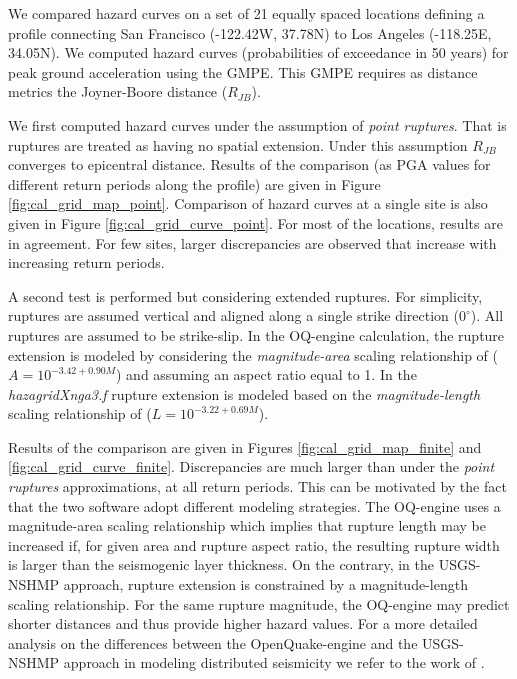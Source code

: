 We compared hazard curves on a set of 21 equally spaced locations defining a profile connecting San Francisco (-122.42W, 37.78N) to Los Angeles (-118.25E, 34.05N). We computed hazard curves (probabilities of exceedance in 50 years) for peak ground acceleration using the \citet{boore2008} GMPE. This GMPE requires as distance metrics the Joyner-Boore distance ($R_{JB}$). 

We first computed hazard curves under the assumption of \textit{point ruptures}. That is ruptures are treated as having no spatial extension. Under this assumption $R_{JB}$ converges to epicentral distance. Results of the comparison (as PGA values for different return periods along the profile) are given in Figure \ref{fig:cal_grid_map_point}. Comparison of hazard curves at a single site is also given in Figure \ref{fig:cal_grid_curve_point}. For most of the locations, results are in agreement. For few sites, larger discrepancies are observed that increase with increasing return periods.

A second test is performed but considering extended ruptures. For simplicity, ruptures are assumed vertical and aligned along a single strike direction ($0^{\circ}$). All ruptures are assumed to be strike-slip. In the OQ-engine calculation, the rupture extension is modeled by considering the \textit{magnitude-area} scaling relationship of \citet{wells1994} ($A = 10^{-3.42 + 0.90 M}$) and assuming an aspect ratio equal to 1. In the \textit{hazagridXnga3.f} rupture extension is modeled based on the \textit{magnitude-length} scaling relationship of \citet{wells1994} ($L = 10^{-3.22+0.69 M}$).

Results of the comparison are given in Figures \ref{fig:cal_grid_map_finite} and \ref{fig:cal_grid_curve_finite}. Discrepancies are much larger than under the \textit{point ruptures} approximations, at all return periods. This can be motivated by the fact that the two software adopt different modeling strategies. The OQ-engine uses a magnitude-area scaling relationship which implies that rupture length may be increased if, for given area and rupture aspect ratio, the resulting rupture width is larger than the seismogenic layer thickness. On the contrary, in the USGS-NSHMP approach, rupture extension is constrained by a magnitude-length scaling relationship. For the same rupture magnitude, the OQ-engine may predict shorter distances and thus provide higher hazard values. For a more detailed analysis on the differences between the OpenQuake-engine and the USGS-NSHMP approach in modeling distributed seismicity we refer to the work of \citet{monelli2014}.

